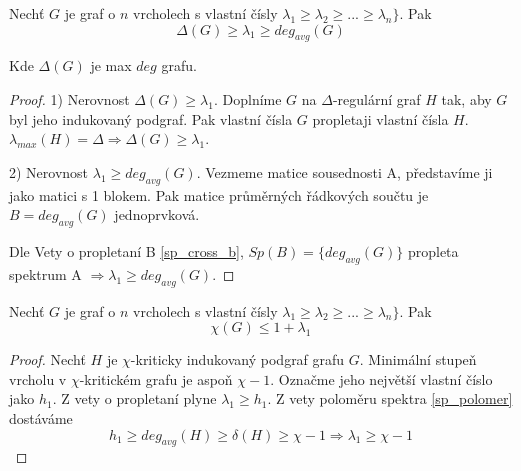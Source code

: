 \begin{theorem}\label{sp_polomer}
	Nechť $G$ je graf o $n$ vrcholech s vlastní čísly $\lambda_1 \geq \lambda_2 \geq ... \geq \lambda_n \}$. Pak
	\[ \Delta(G) \geq \lambda_1 \geq deg_{avg}(G) \]

	Kde $\Delta(G)$ je max $deg$ grafu.
\end{theorem}
\begin{proof}
	1) Nerovnost $\Delta(G) \geq \lambda_1$. Doplníme $G$ na $\Delta$-regulární graf $H$ tak, aby $G$ byl jeho indukovaný podgraf. Pak vlastní čísla $G$ propletaji vlastní čísla $H$. $\lambda_{max}(H) = \Delta \Rightarrow \Delta(G) \geq \lambda_1$.

	2) Nerovnost $\lambda_1 \geq deg_{avg}(G)$.
	Vezmeme matice sousednosti A, představíme ji jako matici s 1 blokem. Pak matice průměrných řádkových součtu je $B = deg_{avg}(G)$ jednoprvková.

	Dle Vety o propletaní B \cref{sp_cross_b}, $Sp(B) = \{ deg_{avg}(G)\}$ propleta spektrum A $\Rightarrow \lambda_1 \geq deg_{avg}(G)$.
\end{proof}

\begin{theorem}
	Nechť $G$ je graf o $n$ vrcholech s vlastní čísly $\lambda_1 \geq \lambda_2 \geq ... \geq \lambda_n \}$. Pak
	\[ \chi(G) \leq 1 + \lambda_1 \]
\end{theorem}
\begin{proof}
	Nechť $H$ je $\chi$-kriticky indukovaný podgraf grafu $G$. Minimální stupeň vrcholu v $\chi$-kritickém grafu je aspoň $\chi - 1$.
	Označme jeho největší vlastní číslo jako $h_1$. Z vety o propletaní plyne $\lambda_1 \geq h_1$.
	Z vety poloměru spektra \cref{sp_polomer} dostáváme
	\[ h_1 \geq deg_{avg}(H) \geq \delta(H) \geq \chi - 1 \Rightarrow \lambda_1 \geq \chi - 1 \]
\end{proof}

